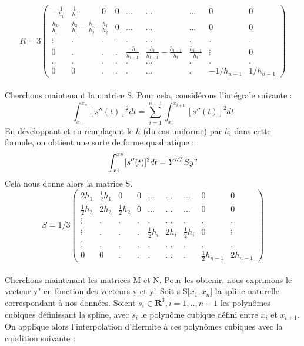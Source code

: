 \documentclass[a4paper,12pt]{article} %
\begin{document}
                $$R=3\begin{pmatrix} -\frac{1}{h_1}&\frac{1}{h_1}&0&0&...&...&...&0&0 \\ \frac{h_2}{h_1}&\frac{h_2}{h_1}-\frac{h_1}{h_2}&\frac{h_1}{h_2}&0&...&...&...&0&0 \\ \vdots&.&.&.&.&...&.&.&.\\ 0&.&.&.&\frac{-h_i}{h_{i-1}}&\frac{h_i}{h_{i-1}}-\frac{h_{i-1}}{h_i}&\frac{h_{i-1}}{h_i}&\vdots&0 \\.&.&.&.&.&...&.&.&. \\ 0&0&.&.&.&...&.&-1/h_{n-1}&1/h_{n-1} \end{pmatrix}$$\\
                
                Cherchons maintenant la matrice S. Pour cela, considérons l'intégrale suivante : \\
                $$\int_{x_1}^{x_n}[s''(t)]^2dt=\sum_{i=1}^{n-1}\int_{x_i}^{x_{i+1}}[s''(t)]^2dt$$
                En développant et en remplaçant le $h$ (du cas uniforme) par $h_i$ dans cette formule, on obtient une sorte de forme quadratique : $$\int_{x1}^{xn}[s''(t)]^2dt= Y''^T S y"$$
                Cela nous donne alors la matrice S. 
                $$S=1/3\begin{pmatrix} 2h_1&\frac{1}{2}h_1&0&0&...&...&...&0&0 \\ \frac{1}{2}h_2&2h_2&\frac{1}{2}h_2&0&...&...&...&0&0 \\ \vdots&.&.&.&.&...&.&.&.\\ \vdots&.&.&.&\frac{1}{2}h_i&2h_i&\frac{1}{2}h_i&0&\vdots \\. \\.&.&.&.&.&...&.&.&. \\ 0&0&.&.&.&...&.&\frac{1}{2}h_{n-1}&2h_{n-1} \end{pmatrix}$$\\
                
                Cherchons maintenant les matrices M et N. Pour les obtenir, nous exprimons le vecteur y" en fonction des  vecteurs y et y'. Soit s \in S[$x_1,x_n$] la spline naturelle correspondant à nos données. Soient $s_i \in \textbf{R}^3,i=1,..,n-1$ les polynômes cubiques définissant la spline, avec $s_i$ le polynôme cubique défini entre $x_i$ et $x_{i+1}$. On applique alors l'interpolation d'Hermite à ces polynômes cubiques avec la condition suivante :
                
\end{document}
